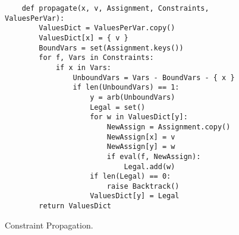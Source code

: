 \begin{figure}[!ht]
\centering
\begin{verbatim}
    def propagate(x, v, Assignment, Constraints, ValuesPerVar):
        ValuesDict = ValuesPerVar.copy()
        ValuesDict[x] = { v }
        BoundVars = set(Assignment.keys())
        for f, Vars in Constraints:
            if x in Vars:
                UnboundVars = Vars - BoundVars - { x }
                if len(UnboundVars) == 1:
                    y = arb(UnboundVars)
                    Legal = set()
                    for w in ValuesDict[y]:
                        NewAssign = Assignment.copy()
                        NewAssign[x] = v
                        NewAssign[y] = w
                        if eval(f, NewAssign):
                            Legal.add(w)
                    if len(Legal) == 0:
                        raise Backtrack()
                    ValuesDict[y] = Legal
        return ValuesDict
\end{verbatim}
\vspace*{-0.3cm}
\caption{Constraint Propagation.}
\label{fig:Constraint-Propagation-Solver.ipynb:propagate}
\end{figure}



